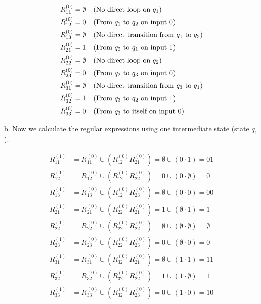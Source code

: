\documentclass{article}
\theoremstyle{theorem}
\theoremstyle{definition}
\theoremstyle{remark}
\begin{document}
\[
\begin{aligned}
R_{11}^{(0)} &= \emptyset \quad \text{(No direct loop on \( q_1 \))} \\
R_{12}^{(0)} &= 0 \quad \text{(From \( q_1 \) to \( q_2 \) on input 0)} \\
R_{13}^{(0)} &= \emptyset \quad \text{(No direct transition from \( q_1 \) to \( q_3 \))} \\
R_{21}^{(0)} &= 1 \quad \text{(From \( q_2 \) to \( q_1 \) on input 1)} \\
R_{22}^{(0)} &= \emptyset \quad \text{(No direct loop on \( q_2 \))} \\
R_{23}^{(0)} &= 0 \quad \text{(From \( q_2 \) to \( q_3 \) on input 0)} \\
R_{31}^{(0)} &= \emptyset \quad \text{(No direct transition from \( q_3 \) to \( q_1 \))} \\
R_{32}^{(0)} &= 1 \quad \text{(From \( q_3 \) to \( q_2 \) on input 1)} \\
R_{33}^{(0)} &= 0 \quad \text{(From \( q_3 \) to itself on input 0)} \\
\end{aligned}
\]

b. Now we calculate the regular expressions using one intermediate state (state \( q_1 \)).

\[
\begin{aligned}
R_{11}^{(1)} &= R_{11}^{(0)} \cup (R_{12}^{(0)} R_{21}^{(0)}) = \emptyset \cup (0 \cdot 1) = 01 \\
R_{12}^{(1)} &= R_{12}^{(0)} \cup (R_{12}^{(0)} R_{22}^{(0)}) = 0 \cup (0 \cdot \emptyset) = 0 \\
R_{13}^{(1)} &= R_{13}^{(0)} \cup (R_{12}^{(0)} R_{23}^{(0)}) = \emptyset \cup (0 \cdot 0) = 00 \\
R_{21}^{(1)} &= R_{21}^{(0)} \cup (R_{22}^{(0)} R_{21}^{(0)}) = 1 \cup (\emptyset \cdot 1) = 1 \\
R_{22}^{(1)} &= R_{22}^{(0)} \cup (R_{22}^{(0)} R_{22}^{(0)}) = \emptyset \cup (\emptyset \cdot \emptyset) = \emptyset \\
R_{23}^{(1)} &= R_{23}^{(0)} \cup (R_{22}^{(0)} R_{23}^{(0)}) = 0 \cup (\emptyset \cdot 0) = 0 \\
R_{31}^{(1)} &= R_{31}^{(0)} \cup (R_{32}^{(0)} R_{21}^{(0)}) = \emptyset \cup (1 \cdot 1) = 11 \\
R_{32}^{(1)} &= R_{32}^{(0)} \cup (R_{32}^{(0)} R_{22}^{(0)}) = 1 \cup (1 \cdot \emptyset) = 1 \\
R_{33}^{(1)} &= R_{33}^{(0)} \cup (R_{32}^{(0)} R_{23}^{(0)}) = 0 \cup (1 \cdot 0) = 10 \\
\end{aligned}
\]
\end{document}
